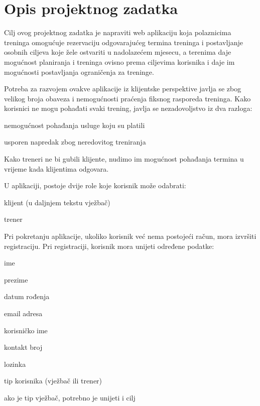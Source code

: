 
\chapter{Opis projektnog zadatka}
		
		{Cilj ovog projektnog zadatka je napraviti web aplikaciju koja polaznicima treninga omogućuje rezervaciju odgovarajućeg termina treninga i postavljanje osobnih ciljeva koje žele ostvariti u nadolazećem mjesecu, a terenima daje mogućnost planiranja i treninga ovisno prema ciljevima korisnika i daje im mogućnosti postavljanja ograničenja za treninge.\\}
		
		
		{Potreba za razvojem ovakve aplikacije iz klijentske perspektive javlja se zbog velikog broja obaveza i nemogućnosti praćenja fiksnog rasporeda treninga. Kako korisnici ne mogu pohađati svaki trening, javlja se nezadovoljstvo iz dva razloga:}
		
		\begin{packed_item}
		    \item {nemogućnost pohađanja usluge koju su platili}
		    \item {usporen napredak zbog neredovitog treniranja}
		\end{packed_item}
		
		{Kako treneri ne bi gubili klijente, nudimo im mogućnost pohađanja termina u vrijeme kada klijentima odgovara.\\}
		
		
		{U aplikaciji, postoje dvije role koje korisnik može odabrati:}
		
		\begin{packed_item}
		    \item {klijent (u daljnjem tekstu vježbač)}
		    \item {trener}
		\end{packed_item}
		
		{Pri pokretanju aplikacije, ukoliko korisnik već nema postojeći račun, mora izvršiti registraciju. Pri registraciji, korisnik mora unijeti određene podatke:}
		
		\begin{packed_item}
		    \item {ime}
		    \item {prezime}
		    \item {datum rođenja}
		    \item {email adresa}
		    \item {korisničko ime}
		    \item {kontakt broj}
		    \item {lozinka}
		    \item {tip korisnika (vježbač ili trener)}
		    \begin{packed_item}
		        \item {ako je tip vježbač, potrebno je unijeti i cilj}
		    \end{packed_item}
		\end{packed_item}
		
